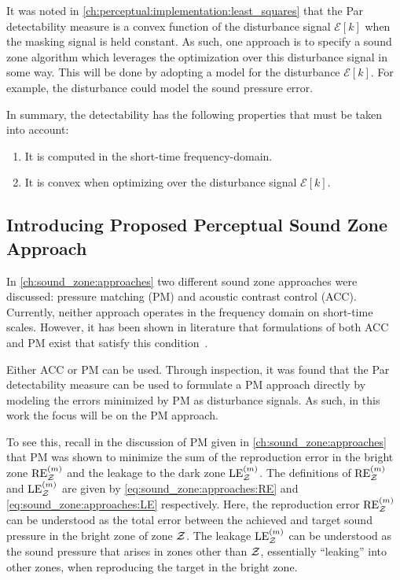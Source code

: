 It was noted in \autoref{ch:perceptual:implementation:least_squares} that the Par detectability measure
is a convex function of the disturbance signal $\mathcal{E}[k]$ when the masking signal is held constant. 
As such, one approach is to specify a sound zone algorithm which leverages the optimization over this disturbance signal in some way.
This will be done by adopting a model for the disturbance $\mathcal{E}[k]$.
For example, the disturbance could model the sound pressure error.

In summary, the detectability has the following properties that must be taken into account:
\begin{enumerate}
    \item It is computed in the short-time frequency-domain.
    \item It is convex when optimizing over the disturbance signal $\mathcal{E}[k]$.
\end{enumerate}

\subsection{Introducing Proposed Perceptual Sound Zone Approach}
\label{ch:sound_zones:approach_selection:selection}
In \autoref{ch:sound_zone:approaches} two different sound zone approaches were discussed: pressure matching (PM)
and acoustic contrast control (ACC).
Currently, neither approach operates in the frequency domain on short-time scales.
However, it has been shown in literature that formulations of both ACC and PM exist that satisfy this condition~\cite{lee2018unified}.

Either ACC or PM can be used.
Through inspection, it was found that the Par detectability measure can be used to formulate a PM approach directly
by modeling the errors minimized by PM as disturbance signals. 
As such, in this work the focus will be on the PM approach.

To see this, recall in the discussion of PM given in \autoref{ch:sound_zone:approaches} that PM was shown to minimize the sum of the 
reproduction error in the bright zone $\text{RE}^{(m)}_{\mathcal{Z}}$ and the leakage to the dark zone $\text{LE}^{(m)}_{\mathcal{Z}}$. 
The definitions of $\text{RE}^{(m)}_{\mathcal{Z}}$ and $\text{LE}^{(m)}_{\mathcal{Z}}$ are given by \autoref{eq:sound_zone:approaches:RE} 
and \autoref{eq:sound_zone:approaches:LE} respectively.
Here, the reproduction error $\text{RE}^{(m)}_{\mathcal{Z}}$ can be understood as the total error between the 
achieved and target sound pressure in the bright zone of zone $\mathcal{Z}$. 
The leakage $\text{LE}^{(m)}_{\mathcal{Z}}$ can be understood as the sound pressure that arises in zones other than $\mathcal{Z}$, essentially ``leaking'' into other zones,
when reproducing the target in the bright zone.

